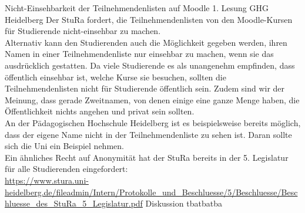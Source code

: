     {
    Nicht-Einsehbarkeit der Teilnehmendenlisten auf Moodle
    }{
        1. Lesung
    }{
        GHG Heidelberg
    }{
        Der StuRa fordert, die Teilnehmendenlisten von den Moodle-Kursen für Studierende nicht-einsehbar zu
        machen.\\
        Alternativ kann den Studierenden auch die Möglichkeit gegeben werden, ihren Namen in einer
        Teilnehmendenliste nur einsehbar zu machen, wenn sie das ausdrücklich gestatten.
    }{
        Da viele Studierende es als unangenehm empfinden, dass öffentlich einsehbar ist, welche Kurse sie
        besuchen, sollten die Teilnehmendenlisten nicht für Studierende öffentlich sein. Zudem sind wir der
        Meinung, dass gerade Zweitnamen, von denen einige eine ganze Menge haben, die Öffentlichkeit nichts
        angehen und privat sein sollten.\\
        An der Pädagogischen Hochschule Heidelberg ist es beispielsweise bereits möglich, dass der eigene
        Name nicht in der Teilnehmendenliste zu sehen ist. Daran sollte sich die Uni ein Beispiel nehmen.\\
        Ein ähnliches Recht auf Anonymität hat der StuRa bereits in der 5. Legislatur für alle Studierenden
        eingefordert:\\
        \url{https://www.stura.uni-heidelberg.de/fileadmin/Intern/Protokolle_und_Beschluesse/5/Beschluesse/Beschluesse_des_StuRa_5_Legislatur.pdf}
    }{
        Diskussion
    }{tba}{tba}{tba}

